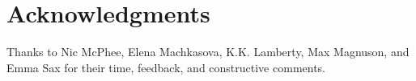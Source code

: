 \documentclass{sig-alternate}
\begin{document}
\section*{Acknowledgments}
\label{sec:acknowledgments}

Thanks to Nic McPhee, Elena Machkasova, K.K. Lamberty, Max Magnuson, and Emma Sax for their time, feedback, and constructive comments.



\end{document}
